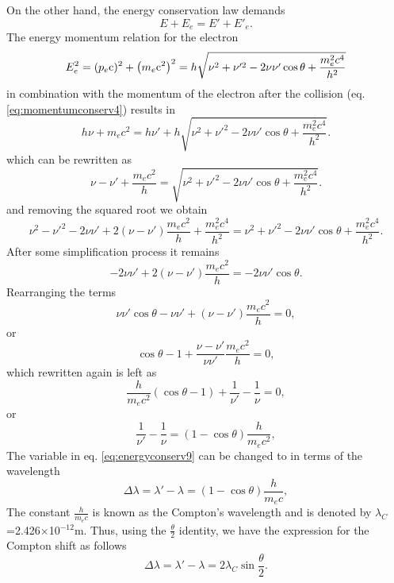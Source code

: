 \documentclass{article}
\begin{document}
On the other hand, the energy conservation law demands 
\begin{equation}\label{eq:energyconserv}
  E+E_e=E'+E'_e.
\end{equation}
The energy momentum relation for the electron
\begin{equation}\label{eq:energyconserv1}
  E_e^2 = (p_e \textrm c)^2 + \left(m_e \textrm c^2\right)^2=h\sqrt{\nu^2+\nu'^2-2\nu\nu'\cos\theta +\frac{m_e^2c^4}{h^2}}
\end{equation}
in combination with the momentum of the electron after the collision (eq. \ref{eq:momentumconserv4}) results in 
\begin{equation}\label{eq:energyconserv2}
  h\nu + m_ec^2 = h\nu' + h\sqrt{\nu^2+\nu'^2-2\nu\nu'\cos\theta +\frac{m_e^2c^4}{h^2}}.
\end{equation}
which can be rewritten as
\begin{equation}\label{eq:energyconserv3}
  \nu - \nu' + \frac{m_ec^2}{h} = \sqrt{\nu^2+\nu'^2-2\nu\nu'\cos\theta +\frac{m_e^2c^4}{h^2}}.
\end{equation}
and removing the squared root we obtain
\begin{equation}\label{eq:energyconserv4}
  \nu^2 - \nu'^2 -2\nu\nu' +2(\nu-\nu')\frac{m_ec^2}{h} + \frac{m^2_ec^4}{h^2}= \nu^2+\nu'^2-2\nu\nu'\cos\theta +\frac{m_e^2c^4}{h^2}.
\end{equation}
After some simplification process it remains
\begin{equation}\label{eq:energyconserv5}
-2\nu\nu' +2(\nu-\nu')\frac{m_ec^2}{h} = -2\nu\nu'\cos\theta.
\end{equation}
Rearranging the terms
\begin{equation}\label{eq:energyconserv6}
  \nu\nu'\cos\theta-\nu\nu' + (\nu-\nu')\frac{m_ec^2}{h} = 0,
\end{equation}
or
\begin{equation}\label{eq:energyconserv7}
  \cos\theta-1 + \frac{\nu-\nu'}{\nu\nu'}\frac{m_ec^2}{h} = 0,
\end{equation}
which rewritten again is left as
\begin{equation}\label{eq:energyconserv8}
  \frac{h}{m_ec^2}(\cos\theta-1) + \frac{1}{\nu'}-\frac{1}{\nu} = 0,
\end{equation}
or
\begin{equation}\label{eq:energyconserv9}
  \frac{1}{\nu'}-\frac{1}{\nu} = (1-\cos\theta)\frac{h}{m_ec^2},
\end{equation}
The variable in eq. \ref{eq:energyconserv9} can be changed to in terms of the wavelength
\begin{equation}\label{eq:energyconserv10}
  \Delta\lambda=\lambda'-\lambda = (1-\cos\theta)\frac{h}{m_ec},
\end{equation}
The constant $\frac{h}{m_ec}$ is known as the Compton's wavelength and is denoted by $\lambda_C$=2.426$\times$10$^{-12}$m. Thus, using the $\frac{\theta}{2}$ identity, we have the expression for the Compton shift as follows
\begin{equation}\label{eq:energyconserv11}
  \Delta\lambda=\lambda'-\lambda = 2\lambda_C\sin\frac{\theta}{2}.
\end{equation}
\end{document}
